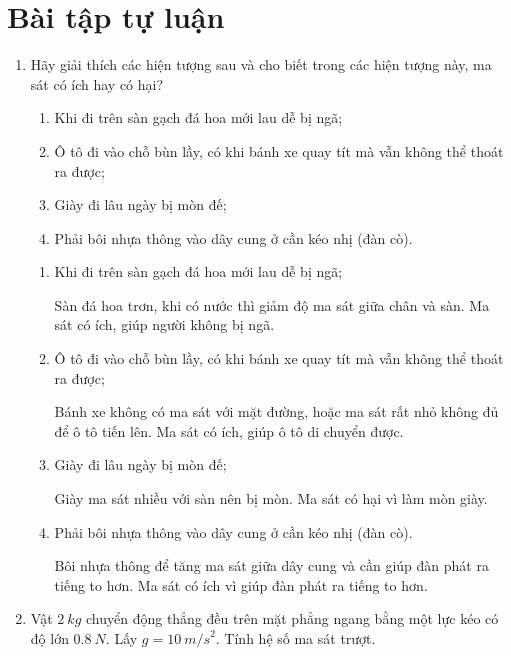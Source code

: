 \section{Bài tập tự luận}
\begin{enumerate}[label=\bfseries Bài \arabic*:]
	\item {}
	
	
	{Hãy giải thích các hiện tượng sau và cho biết trong các hiện tượng này, ma sát có ích hay có hại?
		\begin{enumerate}
			\item Khi đi trên sàn gạch đá hoa mới lau dễ bị ngã;
			\item Ô tô đi vào chỗ bùn lầy, có khi bánh xe quay tít mà vẫn không thể thoát ra được;
			\item Giày đi lâu ngày bị mòn đế;
			\item Phải bôi nhựa thông vào dây cung ở cần kéo nhị (đàn cò).
		\end{enumerate}
	}
	
	\hideall
	{
		\begin{enumerate}
			\item Khi đi trên sàn gạch đá hoa mới lau dễ bị ngã;
			
			Sàn đá hoa trơn, khi có nước thì giảm độ ma sát giữa chân và sàn. Ma sát có ích, giúp người không bị ngã.
			
			\item Ô tô đi vào chỗ bùn lầy, có khi bánh xe quay tít mà vẫn không thể thoát ra được;
			
			Bánh xe không có ma sát với mặt đường, hoặc ma sát rất nhỏ không đủ để ô tô tiến lên. Ma sát có ích, giúp ô tô di chuyển được.
			
			\item Giày đi lâu ngày bị mòn đế;
			
			Giày ma sát nhiều với sàn nên bị mòn. Ma sát có hại vì làm mòn giày.
			
			\item Phải bôi nhựa thông vào dây cung ở cần kéo nhị (đàn cò).
			
			Bôi nhựa thông để tăng ma sát giữa dây cung và cần giúp đàn phát ra tiếng to hơn. Ma sát có ích vì giúp đàn phát ra tiếng to hơn.
		\end{enumerate}
	}

	\item {}
	
	
	{Vật $\SI{2}{kg}$ chuyển động thẳng đều trên mặt phẳng ngang bằng một lực kéo có độ lớn $\SI{0,8}{N}$. Lấy $g=\SI{10}{m/s}^2$. Tính hệ số ma sát trượt.
	}
	

\end{enumerate}
